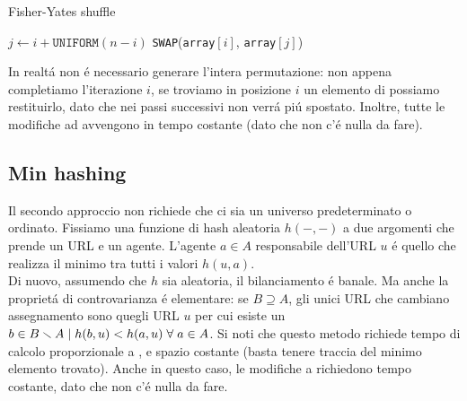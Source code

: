 \begin{algorithm}
\caption{Fisher-Yates shuffle}
\begin{algorithmic}
    \State $j \gets i + \texttt{UNIFORM}(n - i)$
    \State \texttt{SWAP}(\texttt{array}$[i]$, \texttt{array}$[j]$)
    \EndFor
\end{algorithmic}
\end{algorithm}
In realtá non é necessario generare l'intera permutazione: non appena completiamo l'iterazione $i$, se troviamo in posizione $i$ un elemento di  possiamo restituirlo, dato che nei passi successivi non verrá piú spostato. Inoltre, tutte le modifiche ad  avvengono in tempo costante (dato che non c'é nulla da fare).
\subsection{Min hashing}
Il secondo approccio non richiede che ci sia un universo predeterminato o ordinato. Fissiamo una funzione di hash aleatoria $h(-, -)$ a due argomenti che prende un URL e un agente. L'agente $a \in A$ responsabile dell'URL $u$ é quello che realizza il minimo tra tutti i valori $h(u, a)$.\\
Di nuovo, assumendo che $h$ sia aleatoria, il bilanciamento é banale. Ma anche la proprietá di controvarianza é elementare: se $B \supseteq A$, gli unici URL che cambiano assegnamento sono quegli URL $u$ per cui esiste un $b \in B \smallsetminus A \hspace{1mm}|\hspace{1mm} h(b, u) < h(a, u) \hspace{1mm}\forall \hspace{1mm} a \in A$.
Si noti che questo metodo richiede tempo di calcolo proporzionale a , e spazio costante (basta tenere traccia del minimo elemento trovato). Anche in questo caso, le modifiche a  richiedono tempo costante, dato che non c'é nulla da fare.
